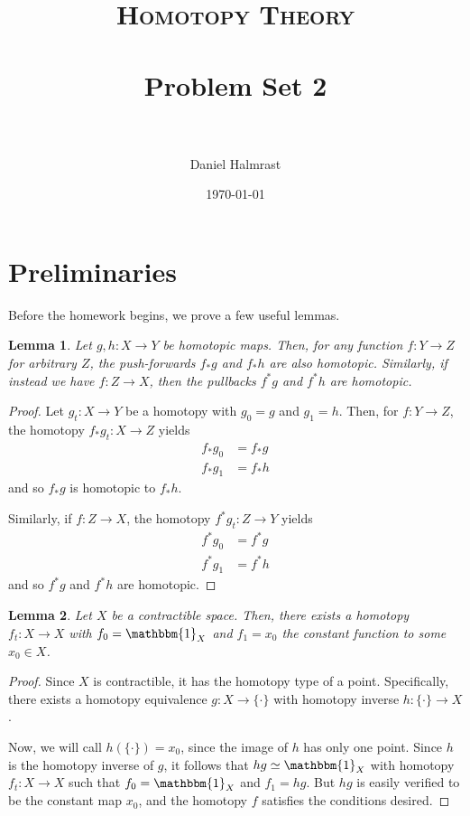 \documentclass[fontsize=11pt]{scrartcl} %
\title{	
\normalfont \normalsize 
\textsc{Homotopy Theory} \\ [25pt] %
\horrule{0.5pt} \\[0.4cm] %
\huge Problem Set 2 \\ %
\horrule{2pt} \\[0.5cm] %
}
\author{Daniel Halmrast} %
\date{\normalsize\today} %
\numberwithin{equation}{section} %
\numberwithin{figure}{section} %
\numberwithin{table}{section} %
\newtheorem{lemma}{Lemma}
\begin{document}
\maketitle %

\section*{Preliminaries}
Before the homework begins, we prove a few useful lemmas.
\begin{lemma}
    Let $g,h:X\to Y$ be homotopic maps. Then, for any function $f:Y\to Z$ for
    arbitrary $Z$, the push-forwards $f_*g$ and $f_*h$ are also homotopic.
    Similarly, if instead we have $f:Z\to X$, then the pullbacks $f^*g$ and
    $f^*h$ are homotopic.
\end{lemma}
\begin{proof}
    Let $g_t:X\to Y$ be a homotopy with $g_0=g$ and $g_1=h$. Then, for $f:Y\to
    Z$, the homotopy $f_*g_t:X\to Z$ yields
    \[
        \begin{aligned}
            f_*g_0 &= f_*g\\
            f_*g_1 &= f_*h
        \end{aligned}
    \]
    and so $f_*g$ is homotopic to $f_*h$.

    Similarly, if $f:Z\to X$, the homotopy $f^*g_t:Z\to Y$ yields
    \[
        \begin{aligned}
            f^*g_0 &= f^*g\\
            f^*g_1 &= f^*h
        \end{aligned}
    \]
    and so $f^*g$ and $f^*h$ are homotopic.
\end{proof}

\begin{lemma}
    Let $X$ be a contractible space. Then, there exists a homotopy $f_t:X\to X$
    with $f_0=\mathbbm{1}_X$ and $f_1=x_0$ the constant function to some $x_0\in
    X$.
\end{lemma}
\begin{proof}
    Since $X$ is contractible, it has the homotopy type of a point.
    Specifically, there exists a homotopy equivalence $g:X\to\{\cdot\}$ with
    homotopy inverse $h:\{\cdot\}\to X$.

    Now, we will call $h(\{\cdot\}) = x_0$, since the image of $h$ has only one
    point. Since $h$ is the homotopy inverse of $g$, it follows that
    $hg\simeq\mathbbm{1}_X$ with homotopy $f_t:X\to X$ such that
    $f_0=\mathbbm{1}_X$ and $f_1 = hg$. But $hg$ is easily verified to be the
    constant map $x_0$, and the homotopy $f$ satisfies the conditions desired.
\end{proof}
\end{document}
